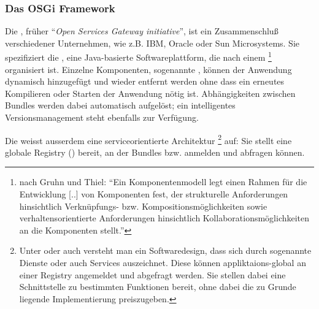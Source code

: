 \subsubsection{Das OSGi Framework}\label{chp:osgi}

Die , früher \enquote{\textit{Open Services Gateway
initiative}}, ist ein Zusammenschluß verschiedener Unternehmen, wie z.B. IBM,
Oracle oder Sun Microsystems.
Sie spezifiziert die , eine Java-basierte
Softwareplattform, die nach einem 
\footnote{nach Gruhn und Thiel\citep{gruhn_komponentenmodelle_2000}:
\enquote{Ein Komponentenmodell legt einen Rahmen für die Entwicklung [..] von
Komponenten fest, der strukturelle Anforderungen hinsichtlich Verknüpfungs-
bzw. Kompositionsmöglichkeiten sowie verhaltensorientierte Anforderungen
hinsichtlich Kollaborationsmöglichkeiten an die Komponenten stellt.}}
organisiert ist.
\citep{wtherich_die_2008}
Einzelne Komponenten, sogenannte , können der Anwendung
dynamisch hinzugefügt und wieder entfernt werden ohne dass ein erneutes
Kompilieren oder Starten der Anwendung nötig ist.
Abhängigkeiten zwischen Bundles werden dabei automatisch aufgelöst; ein
intelligentes Versionsmanagement steht ebenfalls zur Verfügung.

Die  weisst ausserdem eine serviceorientierte
Architektur \footnote{Unter  oder auch
 versteht man ein Softwaredesign, dass
sich durch sogenannte Dienste oder auch Services auszeichnet. Diese können
appliktaions-global an einer Registry angemeldet und abgefragt werden. Sie
stellen dabei eine Schnittstelle zu bestimmten Funktionen bereit, ohne dabei
die zu Grunde liegende Implementierung preiszugeben.}
auf: 
Sie stellt eine globale Registry ()
bereit, an der Bundles  bzw.  anmelden und
abfragen können.




